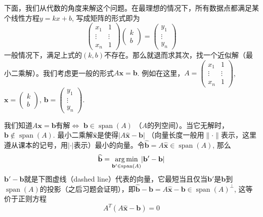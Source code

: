 下面，我们从代数的角度来解这个问题。在最理想的情况下，所有数据点都满足某个线性方程$y = kx + b$, 写成矩阵的形式即为
$$
\begin{pmatrix} x_1 & 1 \\ \vdots & \vdots \\ x_n & 1 \end{pmatrix} \begin{pmatrix} k \\ b \end{pmatrix} = \begin{pmatrix} y_1 \\ \vdots \\ y_n \end{pmatrix}
$$
一般情况下，满足上式的$(k,b)$不存在。那么就退而求其次，找一个近似解（最小二乘解）。我们考虑更一般的形式$A\mathbf{x} = \mathbf{b}$. 例如在这里，$A = \begin{pmatrix} x_1 & 1 \\ \vdots & \vdots \\ x_n & 1 \end{pmatrix}$, $\mathbf{x} = \begin{pmatrix} k \\ b \end{pmatrix}$, $\mathbf{b} = \begin{pmatrix} y_1 \\ \vdots \\ y_n \end{pmatrix}$.

我们知道$A\mathbf{x} = \mathbf{b}$有解$\Longleftrightarrow$ $\mathbf{b} \in \operatorname{span}(A)$ （$A$的列空间）。当它无解时，$\mathbf{b} \not\in \operatorname{span}(A)$. 最小二乘解$\widehat{\mathbf{x}}$是使得$\lvert A\widehat{\mathbf{x}}-\mathbf{b} \rvert$ （向量长度一般用$\lVert \cdot \rVert$表示，这里遵从课本的记号，用$\lvert \cdot \rvert$表示）最小的向量。令$\widehat{\mathbf{b}} = A\widehat{\mathbf{x}} \in \operatorname{span}(A)$, 那么
$$\widehat{\mathbf{b}} = \operatorname*{arg\,min}_{\mathbf{b}' \in \operatorname{span}(A)} \lvert \mathbf{b}' - \mathbf{b} \rvert$$
$\mathbf{b}' - \mathbf{b}$就是下图虚线（dashed line）代表的向量，它最短当且仅当$\mathbf{b}'$是$\mathbf{b}$到$\operatorname{span}(A)$的投影（之后习题会证明），即$\widehat{\mathbf{b}} - \mathbf{b} = A\widehat{\mathbf{x}}-\mathbf{b} \in \operatorname{span}(A)^{\perp}$, 这等价于正则方程
$$A^T(A\widehat{\mathbf{x}}-\mathbf{b}) = 0$$

